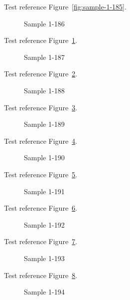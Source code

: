 Test reference Figure~\ref{fig:sample-1-185}.

\begin{figure}[tbhp]
\caption{Sample 1-186}
\label{fig:sample-1-186}
\end{figure}

Test reference Figure~\ref{fig:sample-1-186}.

\begin{figure}[tbhp]
\caption{Sample 1-187}
\label{fig:sample-1-187}
\end{figure}

Test reference Figure~\ref{fig:sample-1-187}.

\begin{figure}[tbhp]
\caption{Sample 1-188}
\label{fig:sample-1-188}
\end{figure}

Test reference Figure~\ref{fig:sample-1-188}.

\begin{figure}[tbhp]
\caption{Sample 1-189}
\label{fig:sample-1-189}
\end{figure}

Test reference Figure~\ref{fig:sample-1-189}.

\begin{figure}[tbhp]
\caption{Sample 1-190}
\label{fig:sample-1-190}
\end{figure}

Test reference Figure~\ref{fig:sample-1-190}.

\begin{figure}[tbhp]
\caption{Sample 1-191}
\label{fig:sample-1-191}
\end{figure}

Test reference Figure~\ref{fig:sample-1-191}.

\begin{figure}[tbhp]
\caption{Sample 1-192}
\label{fig:sample-1-192}
\end{figure}

Test reference Figure~\ref{fig:sample-1-192}.

\begin{figure}[tbhp]
\caption{Sample 1-193}
\label{fig:sample-1-193}
\end{figure}

Test reference Figure~\ref{fig:sample-1-193}.

\begin{figure}[tbhp]
\caption{Sample 1-194}
\label{fig:sample-1-194}
\end{figure}


